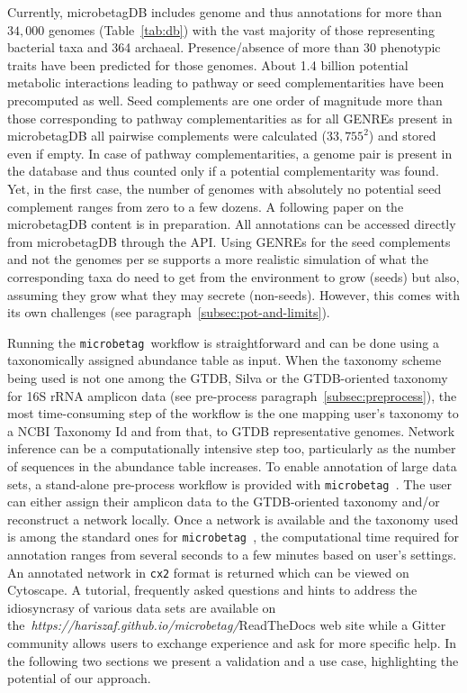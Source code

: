 \documentclass[sn-mathphys,Numbered]{sn-jnl}  %
\theoremstyle{thmstyleone}%
\theoremstyle{thmstyletwo}%
\theoremstyle{thmstylethree}%
\newcommand{\microbetag}{\texttt{microbetag }}
\begin{document}
        Currently, microbetagDB includes genome and thus annotations for more than $34,000$ genomes (Table~\ref{tab:db}) with the vast majority of those representing bacterial taxa and 364 archaeal.
        Presence/absence of more than 30 phenotypic traits have been predicted for those genomes.
        About 1.4 billion potential metabolic interactions leading to pathway or seed complementarities have been precomputed as well.
        Seed complements are one order of magnitude more than those corresponding to pathway complementarities as for all GENREs present in microbetagDB all pairwise complements were calculated ($33,755^2$) and stored even if empty.
        In case of pathway complementarities, a genome pair is present in the database and thus counted only if a potential complementarity was found.
        Yet, in the first case, the number of genomes with absolutely no potential seed complement ranges from zero to a few dozens.
        A following paper on the microbetagDB content is in preparation.
        All annotations can be accessed directly from microbetagDB through the API.
        Using GENREs for the seed complements and not the genomes per se supports a more realistic simulation of what the corresponding taxa do need to get from the environment to grow (seeds) but also, assuming they grow what they may secrete (non-seeds).
        However, this comes with its own challenges (see paragraph~\ref{subsec:pot-and-limits}). 

        Running the \microbetag workflow is straightforward and can be done using a taxonomically assigned abundance table as input.
        When the taxonomy scheme being used is not one among the GTDB, Silva or the GTDB-oriented taxonomy for 16S rRNA amplicon data (see pre-process paragraph~\ref{subsec:preprocess}), the most time-consuming step of the workflow is the one mapping user's taxonomy to a NCBI Taxonomy Id and from that, to GTDB representative genomes. 
        Network inference can be a computationally intensive step too, particularly as the number of sequences in the abundance table increases. 
        To enable annotation of large data sets, a stand-alone pre-process workflow is provided with \microbetag.
        The user can either assign their amplicon data to the GTDB-oriented taxonomy and/or reconstruct a network locally. 
        Once a network is available and the taxonomy used is among the standard ones for \microbetag, the computational time required for annotation ranges from several seconds to a few minutes based on user's settings.
        An annotated network in \texttt{cx2} format is returned which can be viewed on Cytoscape.
        A tutorial, frequently asked questions and hints to address the idiosyncrasy of various data sets are available on the~\textit{https://hariszaf.github.io/microbetag/}{ReadTheDocs web site} while a Gitter community allows users to exchange experience and ask for more specific help.
        In the following two sections we present a validation and a use case, highlighting the potential of our approach.
\end{document}
